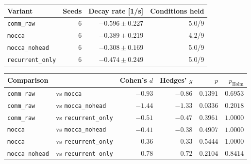 \begin{tabular}{lrrr}
\toprule
Variant & Seeds & Decay rate [1/s] & Conditions held \\
\midrule
\texttt{comm\_raw} & 6 & $-0.596 \pm 0.227$ & 5.0/9 \\
\texttt{mocca} & 6 & $-0.389 \pm 0.219$ & 4.2/9 \\
\texttt{mocca\_nohead} & 6 & $-0.308 \pm 0.169$ & 5.0/9 \\
\texttt{recurrent\_only} & 6 & $-0.474 \pm 0.249$ & 5.0/9 \\
\bottomrule
\end{tabular}

\vspace{0.5em}

\begin{tabular}{llrrrr}
\toprule
Comparison & & Cohen's $d$ & Hedges' $g$ & $p$ & $p_{\mathrm{Holm}}$ \\
\midrule
\texttt{comm\_raw} & vs \texttt{mocca} & $-0.93$ & $-0.86$ & $0.1391$ & $0.6953$ \\
\texttt{comm\_raw} & vs \texttt{mocca\_nohead} & $-1.44$ & $-1.33$ & $0.0336$ & $0.2018$ \\
\texttt{comm\_raw} & vs \texttt{recurrent\_only} & $-0.51$ & $-0.47$ & $0.3961$ & $1.0000$ \\
\texttt{mocca} & vs \texttt{mocca\_nohead} & $-0.41$ & $-0.38$ & $0.4907$ & $1.0000$ \\
\texttt{mocca} & vs \texttt{recurrent\_only} & $0.36$ & $0.33$ & $0.5444$ & $1.0000$ \\
\texttt{mocca\_nohead} & vs \texttt{recurrent\_only} & $0.78$ & $0.72$ & $0.2104$ & $0.8414$ \\
\bottomrule
\end{tabular}
